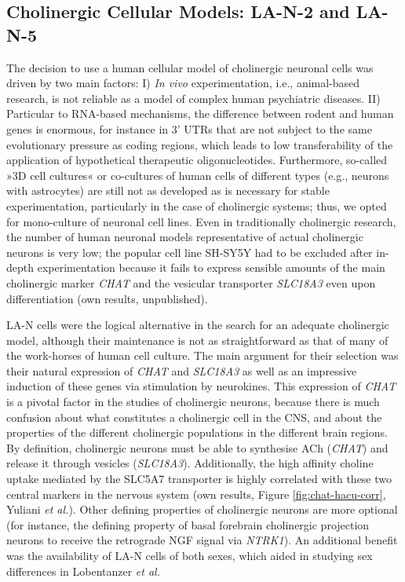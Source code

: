 \subsection{Cholinergic Cellular Models: LA-N-2 and LA-N-5}
The decision to use a human cellular model of cholinergic neuronal cells was driven by two main factors: I) \emph{In vivo} experimentation, i.e., animal-based research, is not reliable as a model of complex human psychiatric diseases.\cite{} II) Particular to RNA-based mechanisms, the difference between rodent and human genes is enormous, for instance in 3' UTRs that are not subject to the same evolutionary pressure as coding regions, which leads to low transferability of the application of hypothetical therapeutic oligonucleotides.\cite{} Furthermore, so-called »3D cell cultures« or co-cultures of human cells of different types (e.g., neurons with astrocytes) are still not as developed as is necessary for stable experimentation, particularly in the case of cholinergic systems;\cite{} thus, we opted for mono-culture of neuronal cell lines. Even in traditionally cholinergic research, the number of human neuronal models representative of actual cholinergic neurons is very low; the popular cell line SH-SY5Y had to be excluded after in-depth experimentation because it fails to express sensible amounts of the main cholinergic marker \emph{CHAT} and the vesicular transporter \emph{SLC18A3} even upon differentiation (own results, unpublished).

LA-N cells were the logical alternative in the search for an adequate cholinergic model, although their maintenance is not as straightforward as that of many of the work-horses of human cell culture. The main argument for their selection was their natural expression of \emph{CHAT} and \emph{SLC18A3} as well as an impressive induction of these genes via stimulation by neurokines. This expression of \emph{CHAT} is a pivotal factor in the studies of cholinergic neurons, because there is much confusion about what constitutes a cholinergic cell in the CNS, and about the properties of the different cholinergic populations in the different brain regions. By definition, cholinergic neurons must be able to synthesise ACh (\emph{CHAT}) and release it through vesicles (\emph{SLC18A3}). Additionally, the high affinity choline uptake mediated by the SLC5A7 transporter is highly correlated with these two central markers in the nervous system (own results, Figure \ref{fig:chat-hacu-corr}, Yuliani \emph{et al.}\cite{Yuliani2020}). Other defining properties of cholinergic neurons are more optional (for instance, the defining property of basal forebrain cholinergic projection neurons to receive the retrograde NGF signal via \emph{NTRK1}). An additional benefit was the availability of LA-N cells of both sexes, which aided in studying sex differences in Lobentanzer \emph{et al.}\cite{Lobentanzer2019a}

